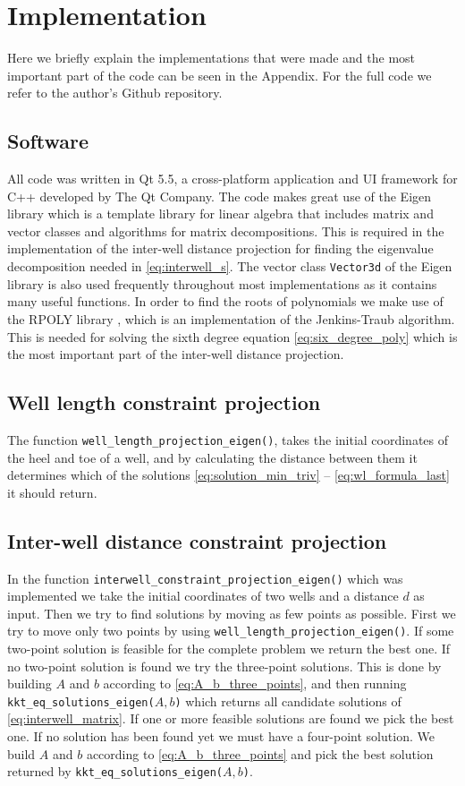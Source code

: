 %
\chapter{Implementation}
%
Here we briefly explain the implementations that were
made and the most important part of the code can
be seen in the Appendix. For the full code we refer
to the author's Github repository\cite{Hilmar_git}.
%
\section{Software}
All code was written in Qt 5.5, a cross-platform application and UI 
framework for C++ developed by The Qt Company\cite{QtCompany}.
%
The code makes great use of the Eigen library\cite{Eigen_library} 
which is a template library for linear algebra that includes
matrix and vector classes and algorithms for matrix decompositions.
This is required in the implementation of the inter-well distance
projection for finding the eigenvalue decomposition needed in
\eqref{eq:interwell_s}. The vector class \texttt{Vector3d} of
the Eigen library is also used frequently throughout most
implementations as it contains many useful functions.
%
In order to find the roots of polynomials we make use of the 
RPOLY library \cite{Rpoly}, which is an implementation of the 
Jenkins-Traub algorithm\cite{Jenkins_traub}. This is needed for
solving the sixth degree equation \eqref{eq:six_degree_poly} 
which is the most important part of the inter-well distance 
projection.
%
%
\section{Well length constraint projection}
%
The function \texttt{well\_length\_projection\_eigen()}, takes
the initial coordinates of the heel and toe of a well, and by
calculating the distance between them it determines which of the 
solutions \eqref{eq:solution_min_triv} -- \eqref{eq:wl_formula_last}
it should return.  
%
%
\section{Inter-well distance constraint projection}
%
In the function \texttt{interwell\_constraint\_projection\_eigen()}
which was implemented we take the initial coordinates of two
wells and a distance $d$ as input. Then we try to find solutions by 
moving as few points as possible. First we try to move only two
points by using \texttt{well\_length\_projection\_eigen()}.
If some two-point solution is feasible for the complete
problem we return the best one. If no two-point solution is
found we try the three-point solutions. This is done by
building $A$ and $b$ according to \eqref{eq:A_b_three_points},
and then running \texttt{kkt\_eq\_solutions\_eigen($A,b$)} which
returns all candidate solutions of \eqref{eq:interwell_matrix}.
If one or more feasible solutions are found we pick the best one.
If no solution has been found yet we must have a four-point
solution. We build $A$ and $b$ according to \eqref{eq:A_b_three_points}
and pick the best solution returned by 
\texttt{kkt\_eq\_solutions\_eigen($A,b$)}.
%
